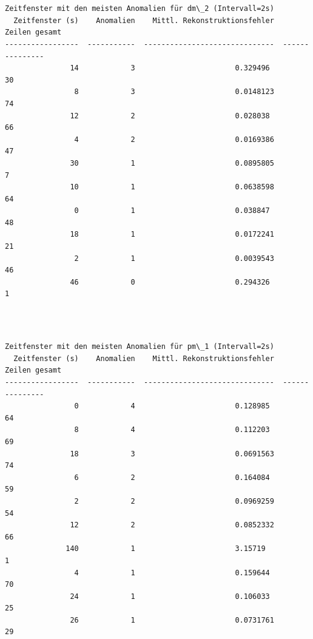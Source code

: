 \documentclass[11pt]{article}
\begin{document}
    \begin{center}
    \end{center}
    { \hspace*{\fill} \\}
    
    \begin{Verbatim}[commandchars=\\\{\}]

Zeitfenster mit den meisten Anomalien für dm\_2 (Intervall=2s)
  Zeitfenster (s)    Anomalien    Mittl. Rekonstruktionsfehler    Zeilen gesamt
-----------------  -----------  ------------------------------  ---------------
               14            3                       0.329496                30
                8            3                       0.0148123               74
               12            2                       0.028038                66
                4            2                       0.0169386               47
               30            1                       0.0895805                7
               10            1                       0.0638598               64
                0            1                       0.038847                48
               18            1                       0.0172241               21
                2            1                       0.0039543               46
               46            0                       0.294326                 1
    \end{Verbatim}

    \begin{center}
    \end{center}
    { \hspace*{\fill} \\}
    
    \begin{Verbatim}[commandchars=\\\{\}]

Zeitfenster mit den meisten Anomalien für pm\_1 (Intervall=2s)
  Zeitfenster (s)    Anomalien    Mittl. Rekonstruktionsfehler    Zeilen gesamt
-----------------  -----------  ------------------------------  ---------------
                0            4                       0.128985                64
                8            4                       0.112203                69
               18            3                       0.0691563               74
                6            2                       0.164084                59
                2            2                       0.0969259               54
               12            2                       0.0852332               66
              140            1                       3.15719                  1
                4            1                       0.159644                70
               24            1                       0.106033                25
               26            1                       0.0731761               29
    \end{Verbatim}
\end{document}
